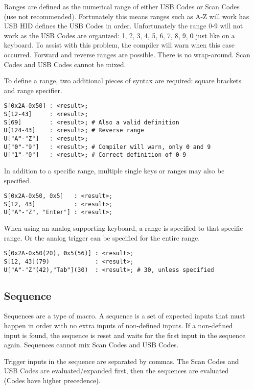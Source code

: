 \documentclass{kiibohd-template}
\begin{document}
Ranges are defined as the numerical range of either USB Codes or Scan Codes (use not recommended).
Fortunately this means ranges such as A-Z will work has USB HID defines the USB Codes in order.
Unfortunately the range 0-9 will not work as the USB Codes are organized: 1, 2, 3, 4, 5, 6, 7, 8, 9, 0 just like on a keyboard.
To assist with this problem, the compiler will warn when this case occurred.
Forward and reverse ranges are possible.
There is no wrap-around.
Scan Codes and USB Codes cannot be mixed.

To define a range, two additional pieces of syntax are required: square brackets and range specifier.

\begin{lstlisting}
S[0x2A-0x50] : <result>;
S[12-43]     : <result>;
S[69]        : <result>; # Also a valid definition
U[124-43]    : <result>; # Reverse range
U["A"-"Z"]   : <result>;
U["0"-"9"]   : <result>; # Compiler will warn, only 0 and 9
U["1"-"0"]   : <result>; # Correct definition of 0-9
\end{lstlisting}

In addition to a specific range, multiple single keys or ranges may also be specified.

\begin{lstlisting}
S[0x2A-0x50, 0x5]   : <result>;
S[12, 43]           : <result>;
U["A"-"Z", "Enter"] : <result>;
\end{lstlisting}

When using an analog supporting keyboard, a range is specified to that specific range.
Or the analog trigger can be specified for the entire range.

\begin{lstlisting}
S[0x2A-0x50(20), 0x5(56)] : <result>;
S[12, 43](79)             : <result>;
U["A"-"Z"(42),"Tab"](30)  : <result>; # 30, unless specified
\end{lstlisting}


\subsection{Sequence}
\label{subsec:Sequence}

Sequences are a type of macro.
A sequence is a set of expected inputs that must happen in order with no extra inputs of non-defined inputs.
If a non-defined input is found, the sequence is reset and waits for the first input in the sequence again.
Sequences cannot mix Scan Codes and USB Codes.

Trigger inputs in the sequence are separated by commas.
The Scan Codes and USB Codes are evaluated/expanded first, then the sequences are evaluated (Codes have higher precedence).
\end{document}

